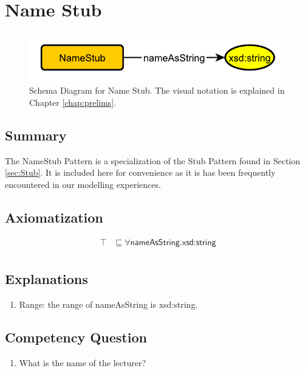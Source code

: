 \section{Name Stub}
\label{sec:Name}
\begin{figure}[h!]
\begin{center}
\includegraphics[width=.7\textwidth]{figures/name}
\end{center}
\caption{Schema Diagram for Name Stub. The visual notation is explained in Chapter \ref{chap:prelims}.}
\label{fig:Name}
\end{figure}
\subsection{Summary}
\label{sum:Name}
The \textsf{NameStub} Pattern is a specialization of the \textsf{Stub} Pattern found in Section \ref{sec:Stub}. It is included here for convenience as it is has been frequently encountered in our modelling experiences.

\subsection{Axiomatization}
\label{axs:Name}
\begin{align}
\top &\sqsubseteq \forall \textsf{nameAsString.xsd:string} \\ 
\end{align}

\subsection{Explanations}
\label{exp:Name}
\begin{enumerate}
\item Range: the range of \textsf{nameAsString} is \textsf{xsd:string}.
\end{enumerate}

\subsection{Competency Question}
\label{cqs:Name}
\begin{enumerate}[CQ1.]
\item What is the name of the lecturer?
\end{enumerate}

\newpage

